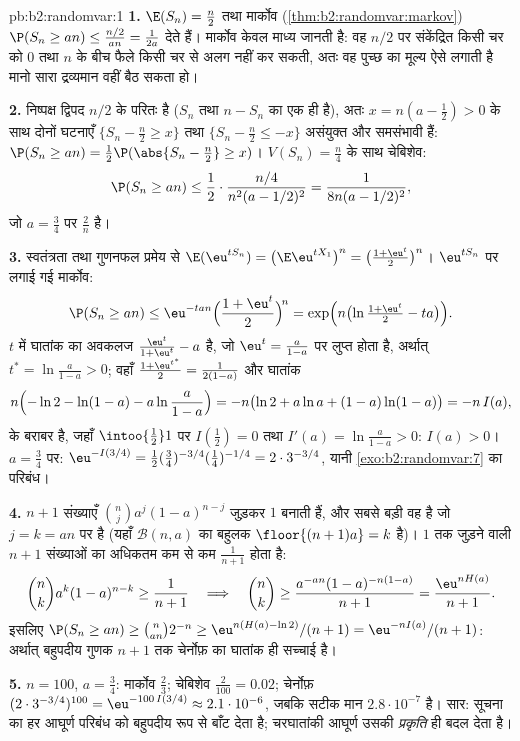 \begin{solution}{pb:b2:randomvar:1}
\textbf{1.} $\E(S_n) = \frac n2$ तथा मार्कोव (\cref{thm:b2:randomvar:markov}) $\P(S_n \geq an) \leq
\frac{n/2}{an} = \frac1{2a}$ देते हैं। मार्कोव केवल
माध्य जानती है: वह $n/2$ पर संकेंद्रित किसी चर को $0$ तथा $n$ के बीच
फैले किसी चर से अलग नहीं कर सकती, अतः वह पुच्छ का मूल्य ऐसे लगाती है
मानो सारा द्रव्यमान वहीं बैठ सकता हो।

\textbf{2.} निष्पक्ष द्विपद $n/2$ के परितः  है ($S_n$ तथा $n - S_n$ का
 एक ही है), अतः $x = n(a -
\frac12) > 0$ के साथ दोनों घटनाएँ $\{S_n - \frac n2 \geq x\}$ तथा $\{S_n - \frac n2 \leq -x\}$ असंयुक्त
और समसंभावी हैं: $\P(S_n \geq an) = \frac12\P(\abs{S_n - \frac n2} \geq x)$। $V(S_n) = \frac n4$ के साथ चेबिशेव:
\[
\P(S_n \geq an)
\leq \frac12\cdot\frac{n/4}{n^2(a - 1/2)^2}
= \frac1{8n(a - 1/2)^2},
\]
जो $a = \frac34$ पर $\frac2n$ है।

\textbf{3.} स्वतंत्रता तथा गुणनफल प्रमेय से $\E(\eu^{tS_n}) = \bigl(\E \eu^{tX_1}\bigr)^n = \bigl(\frac{1
+ \eu^t}2\bigr)^n$। $\eu^{tS_n}$ पर लगाई गई
मार्कोव:
\[
\P(S_n \geq an) \leq \eu^{-tan}\Bigl(\frac{1 +
\eu^t}2\Bigr)^{\!n} = \exp\Bigl(n\bigl(\ln\tfrac{1 +
\eu^t}2 - ta\bigr)\Bigr).
\]
$t$ में घातांक का अवकलज $\frac{\eu^t}{1 + \eu^t}
- a$ है, जो $\eu^t = \frac a{1-a}$ पर लुप्त होता है, अर्थात्
$t^* =
\ln\frac a{1-a} > 0$; वहाँ $\frac{1 + \eu^{t^*}}2 =
\frac1{2(1-a)}$ और घातांक
\[
n\Bigl(-\ln 2 - \ln(1-a) - a\ln\frac a{1-a}\Bigr)
= -n\bigl(\ln2 + a\ln a + (1-a)\ln(1-a)\bigr) = -n\,I(a),
\]
के बराबर है, जहाँ $\intoo{\frac12}1$ पर $I(\frac12) = 0$ तथा $I'(a) = \ln\frac a{1-a} > 0$: $I(a) > 0$। $a = \frac34$ पर: $\eu^{-I(3/4)} = \frac12(\tfrac34)^{-3/4}(\tfrac14)^{-1/4} =
2\cdot3^{-3/4}$,
यानी \cref{exo:b2:randomvar:7} का परिबंध।

\textbf{4.} $n + 1$ संख्याएँ $\binom nja^j(1-a)^{n-j}$ जुड़कर $1$ बनाती हैं, और सबसे बड़ी वह
है जो $j = k = an$ पर है (यहाँ $\mathcal B(n, a)$ का बहुलक $\floor{(n+1)a} = k$ है)। $1$ तक जुड़ने वाली $n + 1$
संख्याओं का अधिकतम कम से कम $\frac1{n+1}$ होता है:
\[
\binom nk a^k(1-a)^{n-k} \geq \frac1{n+1}
\quad\Longrightarrow\quad
\binom nk \geq \frac{a^{-an}(1-a)^{-n(1-a)}}{n+1}
= \frac{\eu^{nH(a)}}{n+1}.
\]
इसलिए $\P(S_n \geq an) \geq \binom{n}{an}2^{-n} \geq
\eu^{n(H(a) - \ln2)}/(n+1) = \eu^{-nI(a)}/(n+1)$: अर्थात् बहुपदीय गुणक $n + 1$ तक चेर्नोफ़ का घातांक ही
सच्चाई है।

\textbf{5.} $n = 100$, $a = \frac34$: मार्कोव $\frac23$; चेबिशेव $\frac2{100} = 0.02$; चेर्नोफ़ $(2\cdot3^{-3/4})^{100} = \eu^{-100\,I(3/4)} \approx
2.1\cdot10^{-6}$,
जबकि सटीक मान $2.8\cdot10^{-7}$ है। सार: सूचना का हर आघूर्ण परिबंध को बहुपदीय
रूप से बाँट देता है; चरघातांकी आघूर्ण उसकी \emph{प्रकृति} ही बदल
देता है।


\end{solution}
